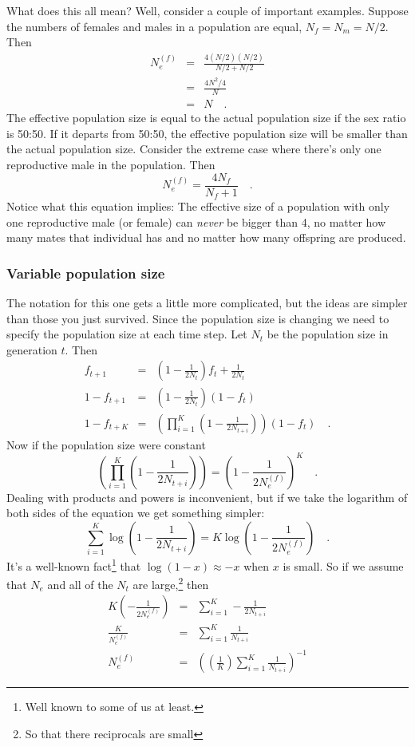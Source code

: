 What does this all mean? Well, consider a couple of important
examples. Suppose the numbers of females and males in a population are
equal, $N_f = N_m = N/2$. Then
\begin{eqnarray*}
N_e^{(f)} &=& \frac{4(N/2)(N/2)}{N/2 + N/2} \\
          &=& \frac{4N^2/4}{N} \\
          &=& N \quad .
\end{eqnarray*}
The effective population size is equal to the actual population size
if the sex ratio is 50:50. If it departs from 50:50, the effective
population size will be smaller than the actual population
size. Consider the extreme case where there's only one reproductive
male in the population. Then
\begin{equation}
N_e^{(f)} = \frac{4N_f}{N_f + 1} \quad . \label{eq:ne-harem}
\end{equation}
Notice what this equation implies: The effective size of a population
with only one reproductive male (or female) can {\it never\/} be
bigger than 4, no matter how many mates that individual has and no
matter how many offspring are produced.

\subsubsection*{Variable population size}

The notation for this one gets a little more complicated, but the
ideas are simpler than those you just survived. Since the population
size is changing we need to specify the population size at each time
step. Let $N_t$ be the population size in generation $t$. Then
\begin{eqnarray*}
f_{t+1} &=& \left(1-\frac{1}{2N_t}\right)f_t + \frac{1}{2N_t} \\
1 - f_{t+1} &=& \left(1-\frac{1}{2N_t}\right)(1-f_t) \\
1 - f_{t+K} &=&
\left(\prod_{i=1}^K\left(1-\frac{1}{2N_{t+i}}\right)\right)(1-f_t) \quad .
\end{eqnarray*}
Now if the population size were constant
\[
\left(\prod_{i=1}^K\left(1-\frac{1}{2N_{t+i}}\right)\right) =
\left(1 - \frac{1}{2N_e^{(f)}}\right)^K \quad .
\]
Dealing with products and powers is inconvenient, but if we take the
logarithm of both sides of the equation we get something simpler:
\[
\sum_{i=1}^K\log\left(1-\frac{1}{2N_{t+i}}\right) =
K\log\left(1 - \frac{1}{2N_e^{(f)}}\right) \quad .
\]
It's a well-known fact\footnote{Well known to some of us at least.}
that $\log(1-x) \approx -x$ when $x$ is small. So if we assume that
$N_e$ and all of the $N_{t}$ are large,\footnote{So that there
  reciprocals are small} then
\begin{eqnarray*}
K\left(-\frac{1}{2N_e^{(f)}}\right)
  &=& \sum_{i=1}^K-\frac{1}{2N_{t+i}} \\
\frac{K}{N_e^{(f)}} &=& \sum_{i=1}^K\frac{1}{N_{t+i}} \\
N_e^{(f)} &=& \left(\left(\frac{1}{K}\right)
                    \sum_{i=1}^K\frac{1}{N_{t+i}}\right)^{-1}
\end{eqnarray*}

